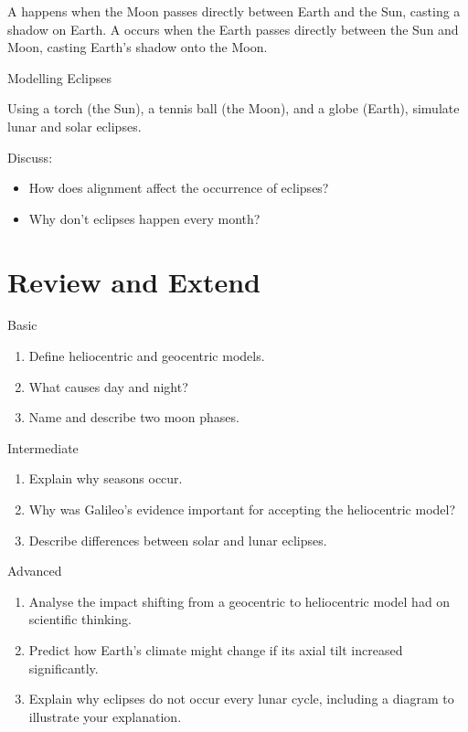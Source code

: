 A  happens when the Moon passes directly between Earth and the Sun, casting a shadow on Earth. A  occurs when the Earth passes directly between the Sun and Moon, casting Earth's shadow onto the Moon.



\begin{investigation}{Modelling Eclipses}

Using a torch (the Sun), a tennis ball (the Moon), and a globe (Earth), simulate lunar and solar eclipses. 

Discuss:
\begin{itemize}
    \item How does alignment affect the occurrence of eclipses?
    \item Why don't eclipses happen every month?
\end{itemize}
\end{investigation}

\section{Review and Extend}

\begin{tieredquestions}{Basic}
\begin{enumerate}
    \item Define heliocentric and geocentric models.
    \item What causes day and night?
    \item Name and describe two moon phases.
\end{enumerate}
\end{tieredquestions}

\begin{tieredquestions}{Intermediate}
\begin{enumerate}
    \item Explain why seasons occur.
    \item Why was Galileo’s evidence important for accepting the heliocentric model?
    \item Describe differences between solar and lunar eclipses.
\end{enumerate}
\end{tieredquestions}

\begin{tieredquestions}{Advanced}
\begin{enumerate}
    \item Analyse the impact shifting from a geocentric to heliocentric model had on scientific thinking.
    \item Predict how Earth's climate might change if its axial tilt increased significantly.
    \item Explain why eclipses do not occur every lunar cycle, including a diagram to illustrate your explanation.
\end{enumerate}
\end{tieredquestions}

